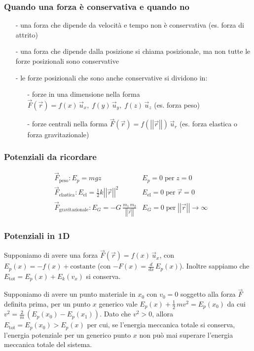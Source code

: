 \documentclass[a4paper]{article}
\newcommand\ux{\vec{u}_x}
\newcommand\uy{\vec{u}_y}
\newcommand\uz{\vec{u}_z}
\newcommand\ur{\vec{u}_r}
\newcommand\vmod[1]{\left|\left|{#1}\right|\right|}
\begin{document}
\subsubsection*{Quando una forza è conservativa e quando no}
\begin{itemize}[topsep=3pt, itemsep=0pt]
	\item[-] una forza che dipende da velocità e tempo non è conservativa (es. forza di attrito)
	\item[-] una forza che dipende dalla posizione si chiama posizionale, ma non tutte le forze posizionali sono conservative
	\item[-] le forze posizionali che sono anche conservative si dividono in:
	\begin{itemize}[topsep=3pt, itemsep=0pt]
		\item[-] forze in una dimensione nella forma \(\vec{F}(\vec{r}) = f(x)\,\ux, \; f(y)\,\uy, \; f(z)\,\uz\) (es. forza peso)
		\item[-] forze centrali nella forma \(\vec{F}(\vec{r}) = f(\vmod{\vec{r}}) \, \ur\) (es. forza elastica o forza gravitazionale)
	\end{itemize}
\end{itemize}

\subsubsection*{Potenziali da ricordare}
\begin{align*}
	&\vec{F}_\text{peso}: E_p = mgz &E_p = 0 \; \text{per} \; z = 0 \\
	&\vec{F}_\text{elastica}: E_\text{el} = \frac{1}{2} k \vmod{\vec{r}}^2 &E_\text{el} = 0 \; \text{per} \; \vec{r} = 0 \\
	&\vec{F}_\text{gravitazionale}: E_G = -G \, \frac{m_1 \, m_2}{\vmod{\vec{r}}} &E_G = 0 \; \text{per} \; \vmod{\vec{r}} \to \infty
\end{align*}

\newpage

\subsubsection*{Potenziali in 1D}
Supponiamo di avere una forza \(\vec{F}(\vec{r}) = f(x) \, \ux\), con \(E_p(x) = -f(x) + \text{costante}\) (con \(-F(x) = \frac{d}{dx}\,E_p(x)\)).
Inoltre sappiamo che \(E_\text{tot} = E_p(x) + E_k(v_x)\) si conserva.

Supponiamo di avere un punto materiale in \(x_0\) con \(v_0 = 0\) soggetto alla forza \(\vec{F}\) definita prima, per un punto
\(x\) generico vale \(E_p(x) + \frac{1}{2} \, mv^2 = E_p(x_0)\) da cui \(v^2 = \frac{2}{m} \, (E_p(x_0)-E_p(x_1))\).
Dato che \(v^2 > 0\), allora \(E_\text{tot} = E_p(x_0) > E_p(x)\) per cui, se l'energia meccanica totale si conserva, l'energia
potenziale per un generico punto \(x\) non può mai superare l'energia meccanica totale del sistema.
\end{document}
